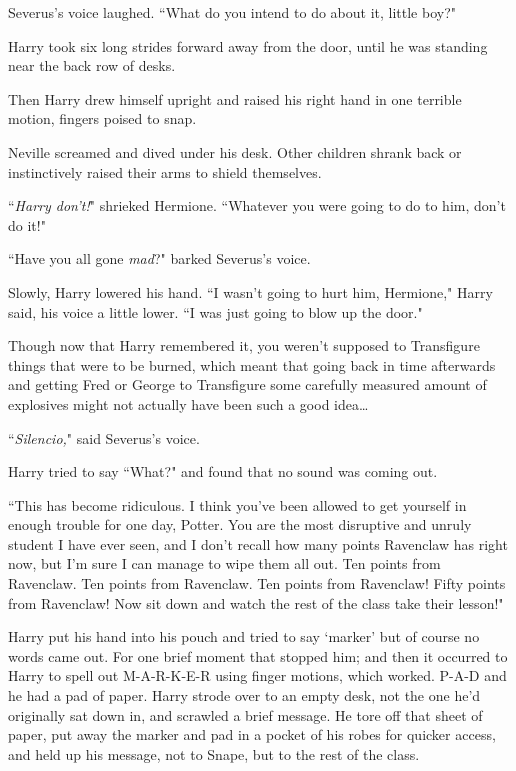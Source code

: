 Severus's voice laughed. ``What do you intend to do about it, little boy?"

Harry took six long strides forward away from the door, until he was standing near the back row of desks.

Then Harry drew himself upright and raised his right hand in one terrible motion, fingers poised to snap.

Neville screamed and dived under his desk. Other children shrank back or instinctively raised their arms to shield themselves.

``\emph{Harry don't!}" shrieked Hermione. ``Whatever you were going to do to him, don't do it!"

``Have you all gone \emph{mad}?" barked Severus's voice.

Slowly, Harry lowered his hand. ``I wasn't going to hurt him, Hermione," Harry said, his voice a little lower. ``I was just going to blow up the door."

Though now that Harry remembered it, you weren't supposed to Transfigure things that were to be burned, which meant that going back in time afterwards and getting Fred or George to Transfigure some carefully measured amount of explosives might not actually have been such a good idea{\ldots}

``\emph{Silencio,}" said Severus's voice.

Harry tried to say ``What?" and found that no sound was coming out.

``This has become ridiculous. I think you've been allowed to get yourself in enough trouble for one day, Potter. You are the most disruptive and unruly student I have ever seen, and I don't recall how many points Ravenclaw has right now, but I'm sure I can manage to wipe them all out. Ten points from Ravenclaw. Ten points from Ravenclaw. Ten points from Ravenclaw! Fifty points from Ravenclaw! Now sit down and watch the rest of the class take their lesson!"

Harry put his hand into his pouch and tried to say `marker' but of course no words came out. For one brief moment that stopped him; and then it occurred to Harry to spell out M-A-R-K-E-R using finger motions, which worked. P-A-D and he had a pad of paper. Harry strode over to an empty desk, not the one he'd originally sat down in, and scrawled a brief message. He tore off that sheet of paper, put away the marker and pad in a pocket of his robes for quicker access, and held up his message, not to Snape, but to the rest of the class.


